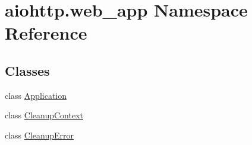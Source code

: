 \hypertarget{namespaceaiohttp_1_1web__app}{}\section{aiohttp.\+web\+\_\+app Namespace Reference}
\label{namespaceaiohttp_1_1web__app}
\subsection*{Classes}
\begin{DoxyCompactItemize}
\item 
class \hyperlink{classaiohttp_1_1web__app_1_1_application}{Application}
\item 
class \hyperlink{classaiohttp_1_1web__app_1_1_cleanup_context}{Cleanup\+Context}
\item 
class \hyperlink{classaiohttp_1_1web__app_1_1_cleanup_error}{Cleanup\+Error}
\end{DoxyCompactItemize}
